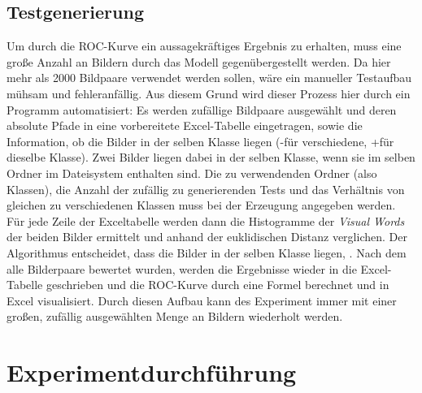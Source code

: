 \subsection{Testgenerierung}

Um durch die ROC-Kurve ein aussagekräftiges Ergebnis zu erhalten, muss eine große Anzahl an Bildern durch das Modell gegenübergestellt werden. Da hier mehr als 2000 Bildpaare verwendet werden sollen, wäre ein manueller Testaufbau mühsam und fehleranfällig. Aus diesem Grund wird dieser Prozess hier durch ein Programm automatisiert: Es werden zufällige Bildpaare ausgewählt und deren absolute Pfade in eine vorbereitete Excel-Tabelle eingetragen, sowie die Information, ob die Bilder in der selben Klasse liegen (\glqq -\grqq für verschiedene, \glqq +\grqq  für dieselbe Klasse). Zwei Bilder liegen dabei in der selben Klasse, wenn sie im selben Ordner im Dateisystem enthalten sind. Die zu verwendenden Ordner (also Klassen), die Anzahl der zufällig zu generierenden Tests und das Verhältnis von gleichen zu verschiedenen Klassen muss bei der Erzeugung angegeben werden. Für jede Zeile der Exceltabelle werden dann die Histogramme der \textit{Visual Words} der beiden Bilder ermittelt und anhand der euklidischen Distanz verglichen. Der Algorithmus entscheidet, dass die Bilder in der selben Klasse liegen, . Nach dem alle Bilderpaare bewertet wurden, werden die Ergebnisse wieder in die Excel-Tabelle geschrieben und die ROC-Kurve durch eine Formel berechnet und in Excel visualisiert. Durch diesen Aufbau kann des Experiment immer mit einer großen, zufällig ausgewählten Menge an Bildern wiederholt werden.

\section{Experimentdurchführung}

